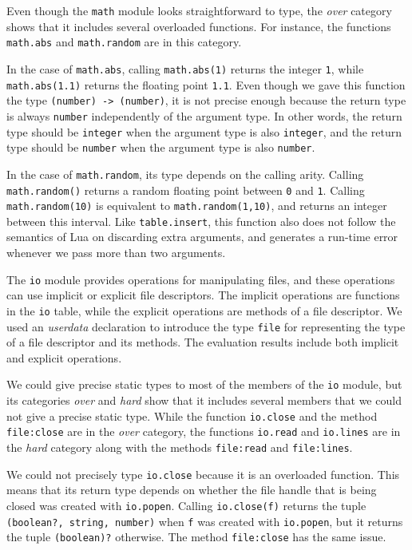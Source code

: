 Even though the \texttt{math} module looks straightforward to type,
the \emph{over} category shows that it includes several overloaded functions.
For instance, the functions \texttt{math.abs} and \texttt{math.random}
are in this category.

In the case of \texttt{math.abs},
calling \texttt{math.abs(1)} returns the integer \texttt{1},
while \texttt{math.abs(1.1)} returns the floating point \texttt{1.1}.
Even though we gave this function the type \texttt{(number) -> (number)},
it is not precise enough because the return type is always \texttt{number}
independently of the argument type.
In other words, the return type should be \texttt{integer} when
the argument type is also \texttt{integer}, and the return type
should be \texttt{number} when the argument type is also \texttt{number}.

In the case of \texttt{math.random}, its type depends on the calling arity.
Calling \texttt{math.random()} returns a random floating point
between \texttt{0} and \texttt{1}.
Calling \texttt{math.random(10)} is equivalent to \texttt{math.random(1,10)},
and returns an integer between this interval.
Like \texttt{table.insert}, this function also does not follow the
semantics of Lua on discarding extra arguments,
and generates a run-time error whenever we pass more than two arguments.

The \texttt{io} module provides operations for manipulating files,
and these operations can use implicit or explicit file descriptors.
The implicit operations are functions in the \texttt{io} table,
while the explicit operations are methods of a file descriptor.
We used an \emph{userdata} declaration to introduce the type
\texttt{file} for representing the type of a file descriptor
and its methods.
The evaluation results include both implicit and explicit operations.

We could give precise static types to most of the members of the
\texttt{io} module, but its categories \emph{over} and \emph{hard}
show that it includes several members that we could not give a precise
static type.
While the function \texttt{io.close} and the method \texttt{file:close}
are in the \emph{over} category,
the functions \texttt{io.read} and \texttt{io.lines} are
in the \emph{hard} category along with the methods
\texttt{file:read} and \texttt{file:lines}.

We could not precisely type \texttt{io.close} because it is
an overloaded function.
This means that its return type depends on whether the file handle
that is being closed was created with \texttt{io.popen}.
Calling \texttt{io.close(f)} returns the tuple \texttt{(boolean?, string, number)}
when \texttt{f} was created with \texttt{io.popen},
but it returns the tuple \texttt{(boolean)?} otherwise.
The method \texttt{file:close} has the same issue.

